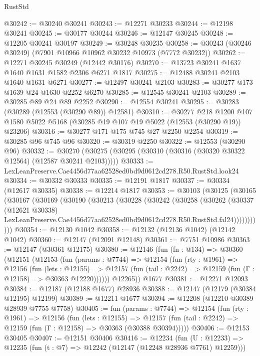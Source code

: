 \begin{lexlean}{RustStd}
\begin{coremodule}
@30242 := @30240 @30241
@30243 := @12271 @30233
@30244 := @12198 @30241
@30245 := @30177 @30244
@30246 := @12147 @30245
@30248 := @12205 @30241 @30197
@30249 := @30248 @30235
@30258 := @30243 (@30246 @30249) (@7901 @10966 @10962 @30232 @10973 (@7772 @30232))
@30262 := @12271 @30245 @30249 (@12442 @30176)
@30270 := @13723 @30241 @1637 @1640 @1631 @1582 @2306 @6271 @1817
@30275 := @12488 @30241 @2103 @1640 @1631 @6271
@30277 := @12497 @30241 @2103
@30283 := @30277 @173 @1639 @24 @1630 @2252 @6270
@30285 := @12545 @30241 @2103
@30289 := @30285 @89 @24 @89 @2252
@30290 := @12554 @30241
@30295 := @30283 (@30289 (@12553 (@30290 @89)) @12581)
@30310 := @30277
    @218
    @1200
    @107
    @1580
    @5022
    @5168
    (@30285 @19 @107 @19 @5022 (@12553 (@30290 @19)) @23206)
@30316 := @30277 @171 @175 @745 @27 @2250 @2254
@30319 := @30285 @96 @745 @96
@30320 := @30319 @2250
@30322 := @12553 (@30290 @96)
@30332 := @30270 (@30275 (@30295 (@30310 (@30316 (@30320 @30322 @12564) (@12587 @30241 @2103)))))
@30333 := LexLeanPreserve.Cae4456d77aa62528ed0bd9d0612cd278.R50.RustStd.look24
@30334 := @30332 @30333
@30335 := @12191 @1817
@30337 := @30334 (@12617 @30335)
@30338 := @12214 @1817
@30353 := @30103
    (@30125
      (@30165
        (@30167
          (@30169
            (@30190
              (@30213
                (@30228
                  (@30242
                    (@30258
                      (@30262
                        (@30337
                          (@12621 @30338)
                          LexLeanPreserve.Cae4456d77aa62528ed0bd9d0612cd278.R50.RustStd.fal24)))))))))))
@30354 := @12130 @1042
@30358 := @12132 (@12136 @1042) (@12142 @1042)
@30360 := @12147 (@12091 @12148)
@30361 := @7751 @10986
@30363 := @12147 (@30361 @12175)
@30380 := @12146
    (fun (fn : @134) =>
    @30360
      (@12151
        (@12153
          (fun (params : @7744) =>
          @12154
            (fun (rty : @1961) =>
            @12156
              (fun (lets : @12155) =>
              @12157 (fun (tail : @2242) => @12159 (fun (Γ : @12158) => @30363 @12220))))))
        @12265))
    @1677
@30381 := @12271 @12093
@30384 := @12187 (@12188 @1677) @28936
@30388 := @12147 (@12179 (@30384 @12195) @12199)
@30389 := @12211 @1677
@30394 := @12208 (@12210 @30389 @28939 @7755 @7758)
@30405 := fun (params : @7744) =>
  @12154
    (fun (rty : @1961) =>
    @12156
      (fun (lets : @12155) =>
      @12157 (fun (tail : @2242) => @12159 (fun (Γ : @12158) => @30363 (@30388 @30394)))))
@30406 := @12153 @30405
@30407 := @12151 @30406
@30416 := @12234
    (fun (U : @12233) => @12235 (fun (t : @7) => @12242 (@12147 (@12248 @28936 @7761) @12259)))

\end{coremodule}
\end{lexlean}
